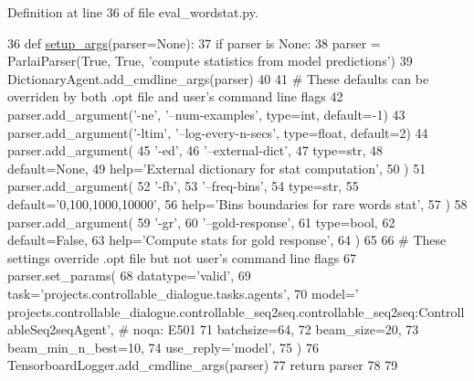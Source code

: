 Definition at line 36 of file eval\+\_\+wordstat.\+py.


\begin{DoxyCode}
36 \textcolor{keyword}{def }\hyperlink{namespaceprojects_1_1controllable__dialogue_1_1eval__wordstat_aa40ff30af74bd5824589612828146ec8}{setup\_args}(parser=None):
37     \textcolor{keywordflow}{if} parser \textcolor{keywordflow}{is} \textcolor{keywordtype}{None}:
38         parser = ParlaiParser(\textcolor{keyword}{True}, \textcolor{keyword}{True}, \textcolor{stringliteral}{'compute statistics from model predictions'})
39     DictionaryAgent.add\_cmdline\_args(parser)
40 
41     \textcolor{comment}{# These defaults can be overriden by both .opt file and user's command line flags}
42     parser.add\_argument(\textcolor{stringliteral}{'-ne'}, \textcolor{stringliteral}{'--num-examples'}, type=int, default=-1)
43     parser.add\_argument(\textcolor{stringliteral}{'-ltim'}, \textcolor{stringliteral}{'--log-every-n-secs'}, type=float, default=2)
44     parser.add\_argument(
45         \textcolor{stringliteral}{'-ed'},
46         \textcolor{stringliteral}{'--external-dict'},
47         type=str,
48         default=\textcolor{keywordtype}{None},
49         help=\textcolor{stringliteral}{'External dictionary for stat computation'},
50     )
51     parser.add\_argument(
52         \textcolor{stringliteral}{'-fb'},
53         \textcolor{stringliteral}{'--freq-bins'},
54         type=str,
55         default=\textcolor{stringliteral}{'0,100,1000,10000'},
56         help=\textcolor{stringliteral}{'Bins boundaries for rare words stat'},
57     )
58     parser.add\_argument(
59         \textcolor{stringliteral}{'-gr'},
60         \textcolor{stringliteral}{'--gold-response'},
61         type=bool,
62         default=\textcolor{keyword}{False},
63         help=\textcolor{stringliteral}{'Compute stats for gold response'},
64     )
65 
66     \textcolor{comment}{# These settings override .opt file but not user's command line flags}
67     parser.set\_params(
68         datatype=\textcolor{stringliteral}{'valid'},
69         task=\textcolor{stringliteral}{'projects.controllable\_dialogue.tasks.agents'},
70         model=\textcolor{stringliteral}{'
      projects.controllable\_dialogue.controllable\_seq2seq.controllable\_seq2seq:ControllableSeq2seqAgent'},  \textcolor{comment}{# noqa: E501}
71         batchsize=64,
72         beam\_size=20,
73         beam\_min\_n\_best=10,
74         use\_reply=\textcolor{stringliteral}{'model'},
75     )
76     TensorboardLogger.add\_cmdline\_args(parser)
77     \textcolor{keywordflow}{return} parser
78 
79 
\end{DoxyCode}
\mbox{\label{namespaceprojects_1_1controllable__dialogue_1_1eval__wordstat_a1bc3cda7d486add0d740338df4688622}} 
